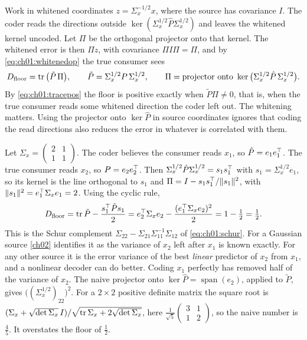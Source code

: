 Work in whitened coordinates $z=\Sigma_x^{-1/2}x$, where the source has
covariance $I$. The coder reads the directions outside
$\ker(\Sigma_x^{1/2}\hat P\Sigma_x^{1/2})$ and leaves the whitened kernel
uncoded. Let $\Pi$ be the orthogonal projector onto that kernel. The whitened
error is then $\Pi z$, with covariance $\Pi I\Pi=\Pi$, and by
\cref{eq:ch01:whitenedop} the true consumer sees
\begin{equation}\label{eq:ch01:floor}
D_{\mathrm{floor}}=\operatorname{tr}\big(\tilde P\,\Pi\big),\qquad \tilde P=\Sigma_x^{1/2}P\,\Sigma_x^{1/2},\qquad
\Pi=\text{projector onto }\operatorname{ker}\big(\Sigma_x^{1/2}\hat P\,\Sigma_x^{1/2}\big).
\end{equation}
By \cref{eq:ch01:tracepos} the floor is positive exactly when $\tilde P\Pi\neq0$,
that is, when the true consumer reads some whitened direction the coder left
out. The whitening matters. Using the projector onto $\ker\hat P$ in source
coordinates ignores that coding the read directions also reduces the error in
whatever is correlated with them.

\begin{example}\label{ex:ch01:floor}
Let $\Sigma_x=\begin{pmatrix}2&1\\1&1\end{pmatrix}$. The coder believes the
consumer reads $x_1$, so $\hat P=e_1e_1^{\top}$. The true consumer reads $x_2$, so
$P=e_2e_2^{\top}$. Then $\Sigma_x^{1/2}\hat P\Sigma_x^{1/2}=s_1s_1^{\top}$ with
$s_1=\Sigma_x^{1/2}e_1$, so its kernel is the line orthogonal to $s_1$ and
$\Pi=I-s_1s_1^{\top}/\lVert s_1\rVert^2$, with $\lVert s_1\rVert^2=e_1^{\top}\Sigma_xe_1=2$. Using
the cyclic rule,
\[
D_{\mathrm{floor}}=\operatorname{tr}\tilde P-\frac{s_1^{\top}\tilde Ps_1}{2}
=e_2^{\top}\Sigma_xe_2-\frac{(e_1^{\top}\Sigma_xe_2)^2}{2}=1-\tfrac12=\tfrac12 .
\]
This is the Schur complement $\Sigma_{22}-\Sigma_{21}\Sigma_{11}^{-1}\Sigma_{12}$
of \cref{eq:ch01:schur}. For a Gaussian source \cref{ch02} identifies it as the
variance of $x_2$ left after $x_1$ is known exactly. For any other source it is
the error variance of the best \emph{linear} predictor of $x_2$ from $x_1$, and
a nonlinear decoder can do better. Coding $x_1$ perfectly has removed half of
the variance of $x_2$. The naive projector onto $\ker\hat P=\operatorname{span}(e_2)$,
applied to $\tilde P$, gives $\big((\Sigma_x^{1/2})_{22}\big)^2$. For a
$2\times2$ positive definite matrix the square root is
$(\Sigma_x+\sqrt{\det\Sigma_x}\,I)/\sqrt{\operatorname{tr}\Sigma_x+2\sqrt{\det\Sigma_x}}$,
here $\tfrac1{\sqrt5}\begin{pmatrix}3&1\\1&2\end{pmatrix}$, so the naive number
is $\tfrac45$. It overstates the floor of $\tfrac12$.
\end{example}

